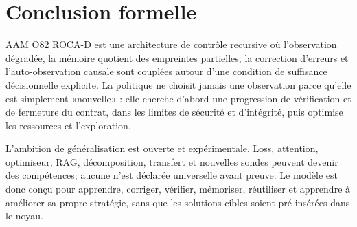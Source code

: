 \documentclass[11pt,a4paper]{report}
\begin{document}
\chapter{Conclusion formelle}
AAM O82 ROCA-D est une architecture de contrôle recursive où l'observation dégradée, la mémoire quotient des empreintes partielles, la correction d'erreurs et l'auto-observation causale sont couplées autour d'une condition de suffisance décisionnelle explicite. La politique ne choisit jamais une observation parce qu'elle est simplement «nouvelle» : elle cherche d'abord une progression de vérification et de fermeture du contrat, dans les limites de sécurité et d'intégrité, puis optimise les ressources et l'exploration.

L'ambition de généralisation est ouverte et expérimentale. Loss, attention, optimiseur, RAG, décomposition, transfert et nouvelles sondes peuvent devenir des compétences; aucune n'est déclarée universelle avant preuve. Le modèle est donc conçu pour apprendre, corriger, vérifier, mémoriser, réutiliser et apprendre à améliorer sa propre stratégie, sans que les solutions cibles soient pré-insérées dans le noyau.
\end{document}
